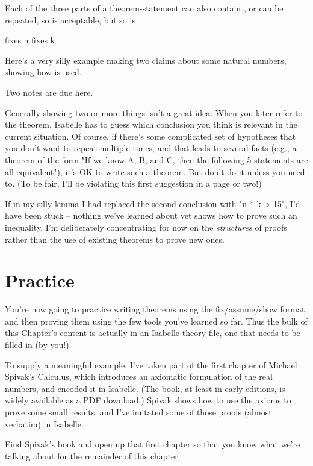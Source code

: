 Each of the three parts of a  theorem-statement can also contain , or can be repeated, so  is acceptable, but so is 
\begin{IS}
  fixes n 
  fixes k    
\end{IS}

Here's a very silly example making two claims about some natural numbers, showing how 
 is used. 


Two notes are due here.

Generally showing two or more things isn't a great idea. When you later refer to the theorem, Isabelle has to guess which conclusion you think is relevant in the current situation. Of course, if there's some complicated set of hypotheses that you don't want to repeat multiple times, and that leads to several facts (e.g., a theorem of the form "If we know A, B, and C, then the following 5 statements are all equivalent"), it's OK to write such a theorem. But don't do it unless you need to. (To be fair, I'll be violating this first suggestion in a page or two!)

If in my silly lemma I had replaced the second conclusion with "n * k > 15", I'd have been stuck -- nothing we've learned about yet shows how to prove such an inequality. I'm deliberately concentrating for now on the \textit{structures} of proofs rather than the use of existing theorems to prove new ones. 

\section{Practice}
You're now going to practice writing theorems using the fix/assume/show format, and then proving them using the few tools you've learned so far. Thus the bulk of this Chapter's content is actually in an Isabelle theory file, one that needs to be filled in (by you!). 

To supply a meaningful example, I've taken part of the first chapter of Michael Spivak's Calculus, which introduces an axiomatic formulation of the real numbers, and encoded it in Isabelle. (The book, at least in early editions, is widely available as a PDF download.) Spivak shows how to use the axioms to prove some small results, and I've imitated some of those proofs (almost verbatim) in Isabelle.

\task Find Spivak's book and open up that first chapter so that you know what we're talking about for the remainder of this chapter. 
\etask

